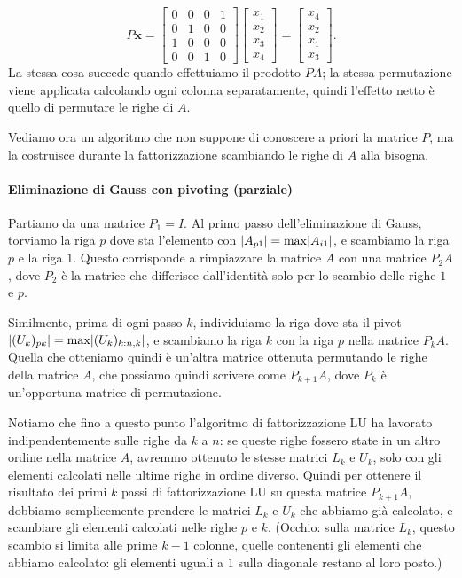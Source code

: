 \documentclass[a4paper]{report}
\DeclarePairedDelimiter{\abs}{\lvert}{\rvert}
\theoremstyle{definition}
\theoremstyle{remark}
\newcommand{\x}{\mathbf{x}}
\begin{document}
\[
P\mathbf{x}
=
\begin{bmatrix}
    0 & 0 & 0 & 1\\
    0 & 1 & 0 & 0\\
    1 & 0 & 0 & 0\\
    0 & 0 & 1 & 0
\end{bmatrix}
\begin{bmatrix}
    x_1\\x_2\\x_3\\x_4
\end{bmatrix} = \begin{bmatrix}
    x_4\\x_2\\x_1\\x_3
\end{bmatrix}.
\]
La stessa cosa succede quando effettuiamo il prodotto $PA$; la stessa permutazione viene applicata calcolando ogni colonna separatamente, quindi l'effetto netto è quello di permutare le righe di $A$.

Vediamo ora un algoritmo che non suppone di conoscere a priori la matrice $P$, ma la costruisce durante la fattorizzazione scambiando le righe di $A$ alla bisogna.

\paragraph{Eliminazione di Gauss con pivoting (parziale)}

Partiamo da una matrice $P_1 = I$. Al primo passo dell'eliminazione di Gauss, torviamo la riga $p$ dove sta l'elemento con $\abs{A_{p1}} = \max \abs{A_{i1}}$, e scambiamo la riga $p$ e la riga $1$. Questo corrisponde a rimpiazzare la matrice $A$ con una matrice $P_2A$, dove $P_2$ è la matrice che differisce dall'identità solo per lo scambio delle righe $1$ e $p$.

Similmente, prima di ogni passo $k$, individuiamo la riga dove sta il pivot $\abs{(U_k)_{pk}} = \max \abs{(U_k)_{k:n,k}}$, e scambiamo la riga $k$ con la riga $p$ nella matrice $P_k A$. Quella che otteniamo quindi è un'altra matrice ottenuta permutando le righe della matrice $A$, che possiamo quindi scrivere come $P_{k+1} A$, dove $P_k$ è un'opportuna matrice di permutazione.

Notiamo che fino a questo punto l'algoritmo di fattorizzazione LU ha lavorato indipendentemente sulle righe da $k$ a $n$: se queste righe fossero state in un altro ordine nella matrice $A$, avremmo ottenuto le stesse matrici $L_k$ e $U_k$, solo con gli elementi calcolati nelle ultime righe in ordine diverso. Quindi per ottenere il risultato dei primi $k$ passi di fattorizzazione LU su questa matrice $P_{k+1} A$, dobbiamo semplicemente prendere le matrici $L_k$ e $U_k$ che abbiamo già calcolato, e scambiare gli elementi calcolati nelle righe $p$ e $k$. (Occhio: sulla matrice $L_k$, questo scambio si limita alle prime $k-1$ colonne, quelle contenenti gli elementi che abbiamo calcolato: gli elementi uguali a $1$ sulla diagonale restano al loro posto.)
\end{document}

